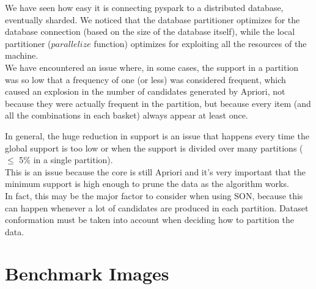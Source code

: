 \documentclass[a4paper]{article}
\begin{document}
	We have seen how easy it is connecting pyspark to a distributed database, eventually sharded.	
	We noticed that the database partitioner optimizes for the database connection (based on the size of the database itself), 
	while the local partitioner ($parallelize$ function) optimizes for exploiting all the resources of the machine.\\
	
	We have encountered an issue where, in some cases, the support in a partition was so low that a frequency of one (or less) was considered frequent, 
	which caused an explosion in the number of candidates generated by Apriori, not because they were actually frequent in the partition, but 
	because every item (and all the combinations in each basket) always appear at least once. 

	In general, the huge reduction in support is an issue that happens every time the global support is too low or when the support is divided over many partitions ($\leq$ 5\% in a single partition).\\
	This is an issue because the core is still Apriori and it's very important that the minimum support is high enough to prune the data as the algorithm works.\\

	In fact, this may be the major factor to consider when using SON, because this can happen whenever a lot of candidates are produced in each partition.
	Dataset conformation must be taken into account when deciding how to partition the data.\\

	
		

	

	\appendix 
	\section{Benchmark Images}
\end{document}
